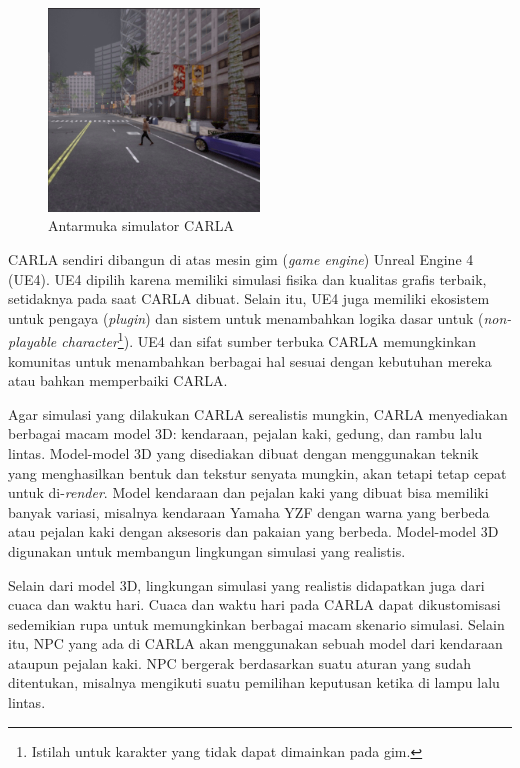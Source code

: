 \begin{figure}[!htbp]
	\centering
	\includegraphics[width=0.5\textwidth]{resources/chapter-2/CARLA-cropped.png}
	\caption{Antarmuka simulator CARLA}
\end{figure}

CARLA sendiri dibangun di atas mesin gim (\textit{game engine}) Unreal Engine 4
(UE4). UE4 dipilih karena memiliki simulasi fisika dan kualitas grafis terbaik,
setidaknya pada saat CARLA dibuat. Selain itu, UE4 juga memiliki ekosistem untuk
pengaya (\textit{plugin}) dan sistem untuk menambahkan logika dasar untuk
(\textit{non-playable character}\footnote{Istilah untuk karakter yang tidak
	dapat dimainkan pada gim.}). UE4 dan sifat sumber terbuka CARLA memungkinkan
komunitas untuk menambahkan berbagai hal sesuai dengan kebutuhan mereka atau
bahkan memperbaiki CARLA.

Agar simulasi yang dilakukan CARLA serealistis mungkin, CARLA menyediakan
berbagai macam model 3D: kendaraan, pejalan kaki, gedung, dan rambu lalu lintas.
Model-model 3D yang disediakan dibuat dengan menggunakan teknik yang
menghasilkan bentuk dan tekstur senyata mungkin, akan tetapi tetap cepat untuk
di-\textit{render}. Model kendaraan dan pejalan kaki yang dibuat bisa memiliki
banyak variasi, misalnya kendaraan Yamaha YZF dengan warna yang berbeda atau
pejalan kaki dengan aksesoris dan pakaian yang berbeda. Model-model 3D
digunakan untuk membangun lingkungan simulasi yang realistis.

Selain dari model 3D, lingkungan simulasi yang realistis didapatkan juga dari
cuaca dan waktu hari. Cuaca dan waktu hari pada CARLA dapat dikustomisasi
sedemikian rupa untuk memungkinkan berbagai macam skenario simulasi.
Selain itu, NPC yang ada di CARLA akan menggunakan sebuah model dari kendaraan
ataupun pejalan kaki. NPC bergerak berdasarkan suatu aturan yang sudah
ditentukan, misalnya mengikuti suatu pemilihan keputusan ketika di lampu lalu
lintas.

